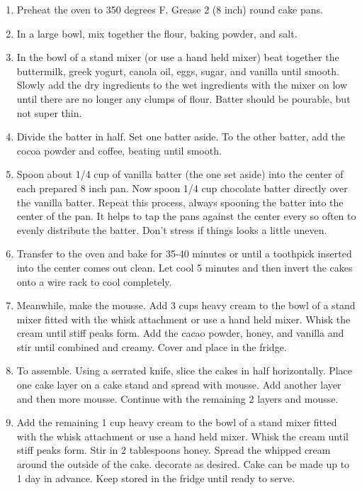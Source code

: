 \documentclass[
  letterpaper,
  DIV=11,
  numbers=noendperiod,
  titlepage=false]{scrreprt}
\providecommand{\tightlist}{%
  \setlength{\itemsep}{0pt}\setlength{\parskip}{0pt}}\usepackage{longtable,booktabs,array}
\begin{document}
\begin{enumerate}
\def\labelenumi{\arabic{enumi}.}
\tightlist
\item
  Preheat the oven to 350 degrees F. Grease 2 (8 inch) round cake pans.
\item
  In a large bowl, mix together the flour, baking powder, and salt.
\item
  In the bowl of a stand mixer (or use a hand held mixer) beat together
  the buttermilk, greek yogurt, canola oil, eggs, sugar, and vanilla
  until smooth. Slowly add the dry ingredients to the wet ingredients
  with the mixer on low until there are no longer any clumps of flour.
  Batter should be pourable, but not super thin.
\item
  Divide the batter in half. Set one batter aside. To the other batter,
  add the cocoa powder and coffee, beating until smooth.
\item
  Spoon about 1/4 cup of vanilla batter (the one set aside) into the
  center of each prepared 8 inch pan. Now spoon 1/4 cup chocolate batter
  directly over the vanilla batter. Repeat this process, always spooning
  the batter into the center of the pan. It helps to tap the pans
  against the center every so often to evenly distribute the batter.
  Don't stress if things looks a little uneven.
\item
  Transfer to the oven and bake for 35-40 minutes or until a toothpick
  inserted into the center comes out clean. Let cool 5 minutes and then
  invert the cakes onto a wire rack to cool completely.
\item
  Meanwhile, make the mousse. Add 3 cups heavy cream to the bowl of a
  stand mixer fitted with the whisk attachment or use a hand held mixer.
  Whisk the cream until stiff peaks form. Add the cacao powder, honey,
  and vanilla and stir until combined and creamy. Cover and place in the
  fridge.
\item
  To assemble. Using a serrated knife, slice the cakes in half
  horizontally. Place one cake layer on a cake stand and spread with
  mousse. Add another layer and then more mousse. Continue with the
  remaining 2 layers and mousse.
\item
  Add the remaining 1 cup heavy cream to the bowl of a stand mixer
  fitted with the whisk attachment or use a hand held mixer. Whisk the
  cream until stiff peaks form. Stir in 2 tablespoons honey. Spread the
  whipped cream around the outside of the cake. decorate as desired.
  Cake can be made up to 1 day in advance. Keep stored in the fridge
  until ready to serve.
\end{enumerate}
\end{document}
